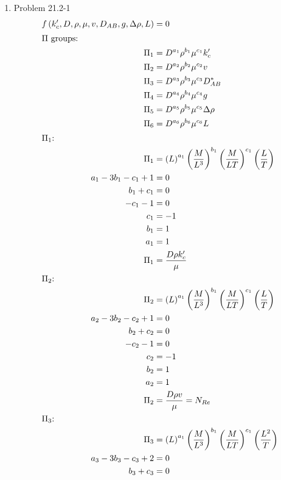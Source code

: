 \documentclass[12pt]{article}
\begin{document}
\begin{enumerate}
\newpage
    \item Problem 21.2-1
    \begin{align*}
        f\left( k_c', D, \rho, \mu, v, D_{AB}, g, \Delta\rho, L \right) &= 0 \\
        \intertext{$\Pi$ groups:}
        \Pi_1 &= D^{a_1} \rho^{b_1} \mu^{c_1} k_c' \\
        \Pi_2 &= D^{a_2} \rho^{b_2} \mu^{c_2} v \\
        \Pi_3 &= D^{a_3} \rho^{b_3} \mu^{c_3} D_{AB}^* \\
        \Pi_4 &= D^{a_4} \rho^{b_4} \mu^{c_4} g \\
        \Pi_5 &= D^{a_5} \rho^{b_5} \mu^{c_5} \Delta\rho \\
        \Pi_6 &= D^{a_6} \rho^{b_6} \mu^{c_6} L \\
        \intertext{$\Pi_1$:}
        \Pi_1 &= \left( L \right)^{a_1} \left( \frac{M}{L^3} \right)^{b_1} \left( \frac{M}{LT} \right)^{c_1} \left( \frac{L}{T} \right) \\
        a_1 - 3 b_1 - c_1 + 1 &= 0 \\
        b_1 + c_1 &= 0 \\
        - c_1 - 1 &= 0 \\
        c_1 &= -1 \\
        b_1 &= 1 \\
        a_1 &= 1 \\
        \Pi_1 &= \frac{D \rho k_c'}{\mu} \\
        \intertext{$\Pi_2$:}
        \Pi_2 &= \left( L \right)^{a_1} \left( \frac{M}{L^3} \right)^{b_1} \left( \frac{M}{LT} \right)^{c_1} \left( \frac{L}{T} \right) \\
        a_2 - 3 b_2 - c_2 + 1 &= 0 \\
        b_2 + c_2 &= 0 \\
        - c_2 - 1 &= 0 \\
        c_2 &= -1 \\
        b_2 &= 1 \\
        a_2 &= 1 \\
        \Pi_2 &= \frac{D \rho v}{\mu} = N_{Re} \\
        \intertext{$\Pi_3$:}
        \Pi_3 &= \left( L \right)^{a_1} \left( \frac{M}{L^3} \right)^{b_1} \left( \frac{M}{LT} \right)^{c_1} \left( \frac{L^2}{T} \right) \\
        a_3 - 3 b_3 - c_3 + 2 &= 0 \\
        b_3 + c_3 &= 0 \\

\end{align*}
\end{enumerate}
\end{document}
